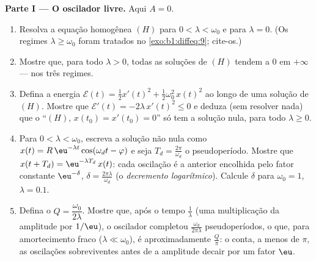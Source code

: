 \begin{problem}
\medskip
\noindent\textbf{Parte I --- O oscilador livre.} Aqui $A = 0$.
\begin{enumerate}
  \item Resolva a equação homogênea $(H)$ para $0 < \lambda <
        \omega_0$ e para $\lambda = 0$. (Os regimes $\lambda
        \geq \omega_0$ foram tratados no \cref{exo:b1:diffeq:9};
        cite-os.)
  \item Mostre que, para todo $\lambda > 0$, todas as soluções de $(H)$
        tendem a $0$ em $+\infty$ --- nos três regimes.
  \item Defina a energia $\mathcal E(t) = \frac12 x'(t)^2 +
        \frac12\omega_0^2\,x(t)^2$ ao longo de uma solução de $(H)$. Mostre que
        $\mathcal E'(t) = -2\lambda\,x'(t)^2 \leq 0$ e deduza
        (sem resolver nada) que o 
        ``$(H)$, $x(t_0) = x'(t_0) = 0$'' só tem a solução
        nula, para todo $\lambda \geq 0$.
  \item Para $0 < \lambda < \omega_0$, escreva a solução não nula como
        $x(t) = R\,\eu^{-\lambda t}\cos(\omega_d t - \varphi)$ e
        seja $T_d = \frac{2\pi}{\omega_d}$ o pseudoperíodo.
        Mostre que $x(t + T_d) = \eu^{-\lambda T_d}\,x(t)$: cada
        oscilação é a anterior encolhida pelo fator constante
        $\eu^{-\delta}$, $\delta = \frac{2\pi\lambda}{\omega_d}$
        (o \emph{decremento logarítmico}). Calcule $\delta$ para
        $\omega_0 = 1$, $\lambda = 0.1$.
  \item Defina o \emph{} $Q =
        \dfrac{\omega_0}{2\lambda}$. Mostre
        que, após o tempo $\frac1\lambda$ (uma multiplicação da
        amplitude por $1/\eu$), o oscilador completou
        $\frac{\omega_d}{2\pi\lambda}$ pseudoperíodos, o que, para
        amortecimento fraco ($\lambda \ll \omega_0$), é aproximadamente
        $\frac Q\pi$: o  conta, a menos de $\pi$, as
        oscilações sobreviventes antes de a amplitude decair por um
        fator $\eu$.
\end{enumerate}


\end{problem}
